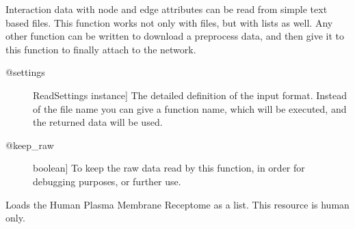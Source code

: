 \documentclass[letterpaper,10pt,english]{sphinxmanual}
\begin{document}
\begin{fulllineitems}

\begin{fulllineitems}
\label{\detokenize{main:pypath.main.PyPath.read_data_file}}
Interaction data with node and edge attributes can be read
from simple text based files. This function works not only
with files, but with lists as well. Any other function can
be written to download a preprocess data, and then give it
to this function to finally attach to the network.
\begin{description}
\item[{@settings}] \leavevmode{[}ReadSettings instance{]}
The detailed definition of the input format. Instead of
the file name you can give a function name, which will
be executed, and the returned data will be used.

\item[{@keep\_raw}] \leavevmode{[}boolean{]}
To keep the raw data read by this function, in order for
debugging purposes, or further use.

\end{description}

\end{fulllineitems}


\begin{fulllineitems}
\label{\detokenize{main:pypath.main.PyPath.receptors_list}}
Loads the Human Plasma Membrane Receptome as a list.
This resource is human only.

\end{fulllineitems}


\begin{fulllineitems}
\label{\detokenize{main:pypath.main.PyPath.remove_htp}}
\end{fulllineitems}


\begin{fulllineitems}
\label{\detokenize{main:pypath.main.PyPath.remove_undirected}}
\end{fulllineitems}


\end{fulllineitems}
\end{document}
